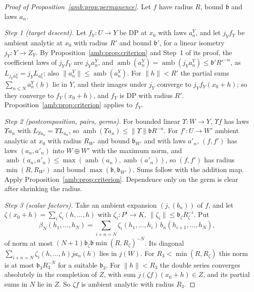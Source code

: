 \documentclass[11pt]{amsart}
\theoremstyle{definition}
\theoremstyle{remark}
\numberwithin{equation}{section}
\newcommand{\norm}[1]{\lVert #1\rVert}
\theoremstyle{plain}
\theoremstyle{definition}
\theoremstyle{plain}
\begin{document}
\begin{proof}[Proof of Proposition~\ref{amb:prop:permanence}]
Let $f$ have radius $R$, bound $\mathfrak b$ and laws $a_n$.

\emph{Step 1 (target descent).} Let $f_Y\colon U\to Y$ be DP at $x_0$ with laws $a^Y_n$, and let $j_Yf_Y$ be ambient analytic at $x_0$ with radius $R'$ and bound $\mathfrak b'$, for a linear isometry $j_Y\colon Y\to Z_Y$. By Proposition~\ref{amb:prop:criterion} and Step~1 of its proof, the coefficient laws of $j_Yf_Y$ are $j_Ya^Y_n$, and $\operatorname{amb}(a^Y_n)=\operatorname{amb}(j_Ya^Y_n)\le \mathfrak b'R'^{-n}$, as $L_{j_Ya^Y_n}=j_YL_{a^Y_n}$; also $\norm{a^Y_n}\le\operatorname{amb}(a^Y_n)$. For $\norm h<R'$ the partial sums $\sum_{n\le N}a^Y_n(h)$ lie in $Y$, and their images under $j_Y$ converge to $j_Yf_Y(x_0+h)$; so they converge to $f_Y(x_0+h)$, and $f_Y$ is DP with radius $R'$. Proposition~\ref{amb:prop:criterion} applies to $f_Y$.

\emph{Step 2 (postcomposition, pairs, germs).} For bounded linear $\Upsilon\colon W\to Y$, $\Upsilon f$ has laws $\Upsilon a_n$ with $L_{\Upsilon a_n}=\Upsilon L_{a_n}$, so $\operatorname{amb}(\Upsilon a_n)\le\norm\Upsilon \mathfrak bR^{-n}$. For $f'\colon U\to W'$ ambient analytic at $x_0$ with radius $R_{W'}$ and bound $\mathfrak b_{W'}$ and with laws $a'_n$, $(f,f')$ has laws $(a_n,a'_n)$ into $W\oplus W'$ with the maximum norm, and $\operatorname{amb}(a_n,a'_n)\le\max(\operatorname{amb}(a_n),\operatorname{amb}(a'_n))$, so $(f,f')$ has radius $\min(R,R_{W'})$ and bound $\max(\mathfrak b,\mathfrak b_{W'})$. Sums follow with the addition map. Apply Proposition~\ref{amb:prop:criterion}. Dependence only on the germ is clear after shrinking the radius.

\emph{Step 3 (scalar factors).} Take an ambient expansion $(j,(b_n))$ of $f$, and let $\zeta(x_0+h)=\sum_i\zeta_i(h,\dots,h)$ with $\zeta_i\colon P^i\to K$, $\norm{\zeta_i}\le \mathfrak b_\zeta R_\zeta^{-i}$. Put
\[
 \beta_N(h_1,\dots,h_N)=\sum_{i+n=N}\zeta_i(h_1,\dots,h_i)\,b_n(h_{i+1},\dots,h_N),
\]
of norm at most $(N+1)\mathfrak b_\zeta \mathfrak b\min(R,R_\zeta)^{-N}$. Its diagonal $\sum_{i+n=N}\zeta_i(h,\dots,h)ja_n(h)$ lies in $j(W)$. For $R_3<\min(R,R_\zeta)$ this norm is at most $\mathfrak b_3R_3^{-N}$ for a suitable $\mathfrak b_3$. For $\norm h<R_3$ the double series converges absolutely in the completion of $Z$, with sum $j(\zeta f)(x_0+h)\in Z$, and its partial sums in $N$ lie in $Z$. So $\zeta f$ is ambient analytic with radius $R_3$.


\end{proof}
\end{document}
